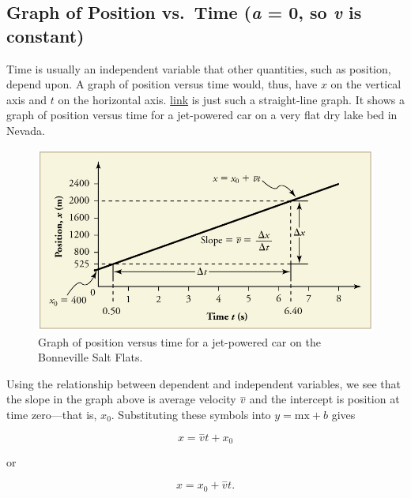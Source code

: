 \documentclass[
]{book}
\begin{document}
\hypertarget{fs-id2201114}{}
\hypertarget{graph-of-position-vs.-time-a-0-so-v-is-constant}{%
\subsection{\texorpdfstring{Graph of Position vs.~Time (\emph{a} = 0, so \emph{v} is constant)}{Graph of Position vs.~Time (a = 0, so v is constant)}}\label{graph-of-position-vs.-time-a-0-so-v-is-constant}}

Time is usually an independent variable that other quantities, such as
position, depend upon. A graph of position versus time would, thus, have
\(x{}\) on the vertical axis and \(t{}\) on the horizontal axis.
\protect\hyperlink{import-auto-id2574769}{link} is just such a
straight-line graph. It shows a graph of position versus time for a
jet-powered car on a very flat dry lake bed in Nevada.

\begin{figure}
\hypertarget{import-auto-id2574769}{%
\centering
\includegraphics{images/Figure_02_07_02.jpg}
\caption{Graph of position versus time for a jet-powered car on the Bonneville
Salt Flats.}\label{import-auto-id2574769}
}
\end{figure}

Using the relationship between dependent and independent variables, we
see that the slope in the graph above is average velocity
\(\overset{-}{v}{}\) and the intercept is position at time zero---that is,
\(x_{0}{}\). Substituting these symbols into \({y = {\text{mx} + b}}{}\)
gives

\leavevmode\hypertarget{import-auto-id4019047}{}%
\[{{x = \overset{-}{v}}{t + x_{0}}}{}\]

or

\leavevmode\hypertarget{import-auto-id2357165}{}%
\[{{{x = {x_{0} + \overset{-}{v}}}t}.}{}\]
\end{document}

